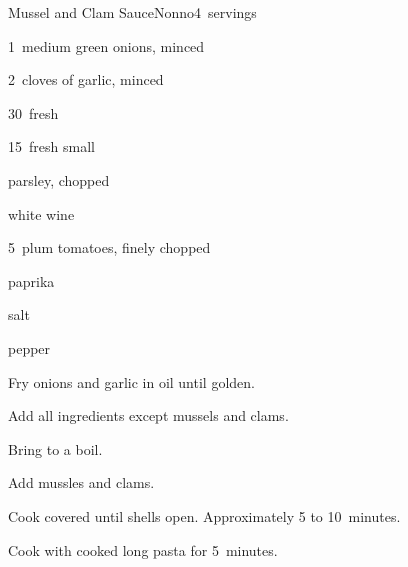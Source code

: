 \begin{recipe}{Mussel and Clam Sauce}{Nonno}{4~servings}

\begin{ingredients}
\item 1~medium green onions, minced
\item 2~cloves of garlic, minced
\item 30~fresh 
\item 15~fresh small 
\item \C{\half} parsley, chopped
\item {} white wine
\item 5~plum tomatoes, finely chopped
\item paprika
\item salt
\item pepper
\end{ingredients}

\begin{directions}
\item Fry onions and garlic in oil until golden.
\item Add all ingredients except mussels and clams.
\item Bring to a boil.
\item Add mussles and clams.
\item Cook covered until shells open. Approximately 5 to 10~minutes.
\item Cook with cooked long pasta for 5~minutes.
\end{directions}

\end{recipe}
